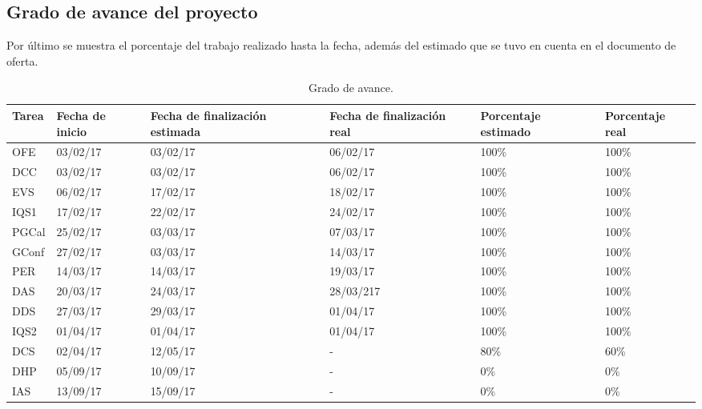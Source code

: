 \subsection{Grado de avance del proyecto}
\par Por último se muestra el porcentaje del trabajo realizado hasta la fecha, además del estimado que se tuvo en cuenta en el documento de oferta.

\begin{table}[H]
\begin{center}
\begin{tabular}{ p{1cm} p{2.5cm} p{2.5cm} p{2.5cm} p{2.5cm} p{2.5cm}}

	Tarea & Fecha de inicio & Fecha de finalización estimada & Fecha de finalización real & Porcentaje estimado & Porcentaje real \\ \hline \hline
OFE	&	03/02/17	&	03/02/17	&	06/02/17	&	100\%	&	100\%	\\ \hline
DCC	&	03/02/17	&	03/02/17	&	06/02/17	&	100\%	&	100\%	\\ \hline
EVS	&	06/02/17	&	17/02/17	&	18/02/17	&	100\%	&	100\%	\\ \hline
IQS1	&	17/02/17	&	22/02/17	&	24/02/17	&	100\%	&	100\%	\\ \hline
PGCal	&	25/02/17	&	03/03/17	&	07/03/17	&	100\%	&	100\%	\\ \hline
GConf	&	27/02/17	&	03/03/17	&	14/03/17	&	100\%	&	100\%	\\ \hline
PER	&	14/03/17	&	14/03/17	&	19/03/17	&	100\%	&	100\%	\\ \hline
DAS	&	20/03/17	&	24/03/17	&	28/03/217	&	100\%	&	100\%	\\ \hline
DDS	&	27/03/17	&	29/03/17	&	01/04/17	&	100\%	&	100\%	\\ \hline
IQS2	&	01/04/17	&	01/04/17	&	01/04/17	&	100\%	&	100\%	\\ \hline
DCS	&	02/04/17	&	12/05/17	&	-	&	80\%	&	60\%	\\ \hline
DHP	&	05/09/17	&	10/09/17	&	-	&	0\%	&	0\%	\\ \hline
IAS	&	13/09/17	&	15/09/17	&	-	&	0\%	&	0\%	\\ \hline
\end{tabular}
\caption{Grado de avance.}
\label{tab:Grado de avance}
\end{center}
\end{table}
